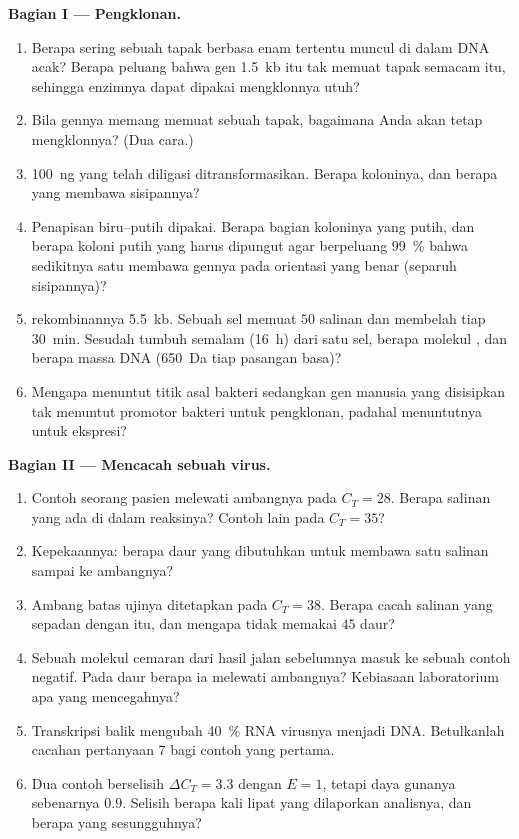 \begin{problem}
\medskip
\noindent\textbf{Bagian I --- Pengklonan.}
\begin{enumerate}
  \item Berapa sering sebuah tapak berbasa enam tertentu muncul di dalam DNA
        acak? Berapa peluang bahwa gen \qty{1.5}{kb} itu tak memuat
        tapak semacam itu, sehingga enzimnya dapat dipakai mengklonnya utuh?
  \item Bila gennya memang memuat sebuah tapak, bagaimana Anda akan tetap
        mengklonnya? (Dua cara.)
  \item \qty{100}{ng}  yang telah diligasi ditransformasikan. Berapa
        koloninya, dan berapa yang membawa sisipannya?
  \item Penapisan biru--putih dipakai. Berapa bagian koloninya yang
        putih, dan berapa koloni putih yang harus dipungut agar berpeluang
        \qty{99}{\%} bahwa sedikitnya satu membawa gennya pada
        orientasi yang benar (separuh sisipannya)?
  \item {} rekombinannya \qty{5.5}{kb}. Sebuah sel memuat $50$
        salinan dan membelah tiap \qty{30}{min}. Sesudah tumbuh semalam
        (\qty{16}{h}) dari satu sel, berapa molekul , dan
        berapa massa DNA  (\qty{650}{Da} tiap pasangan basa)?
  \item Mengapa  menuntut titik asal bakteri sedangkan gen manusia
        yang disisipkan tak menuntut promotor bakteri untuk pengklonan,
        padahal menuntutnya untuk ekspresi?
\end{enumerate}

\medskip
\noindent\textbf{Bagian II --- Mencacah sebuah virus.}
\begin{enumerate}[resume]
  \item Contoh seorang pasien melewati ambangnya pada $C_{T} = 28$. Berapa
        salinan yang ada di dalam reaksinya? Contoh lain pada $C_{T} = 35$?
  \item Kepekaannya: berapa daur yang dibutuhkan untuk membawa satu salinan
        sampai ke ambangnya?
  \item Ambang batas ujinya ditetapkan pada $C_{T} = 38$. Berapa cacah
        salinan yang sepadan dengan itu, dan mengapa tidak memakai $45$ daur?
  \item Sebuah molekul cemaran dari hasil jalan sebelumnya masuk ke sebuah
        contoh negatif. Pada daur berapa ia melewati ambangnya?
        Kebiasaan laboratorium apa yang mencegahnya?
  \item Transkripsi balik mengubah \qty{40}{\%} RNA virusnya menjadi
        DNA. Betulkanlah cacahan pertanyaan 7 bagi contoh yang pertama.
  \item Dua contoh berselisih $\Delta C_{T} = 3.3$ dengan $E = 1$, tetapi
        daya gunanya sebenarnya $0.9$. Selisih berapa kali lipat yang
        dilaporkan analisnya, dan berapa yang sesungguhnya?
\end{enumerate}


\end{problem}
